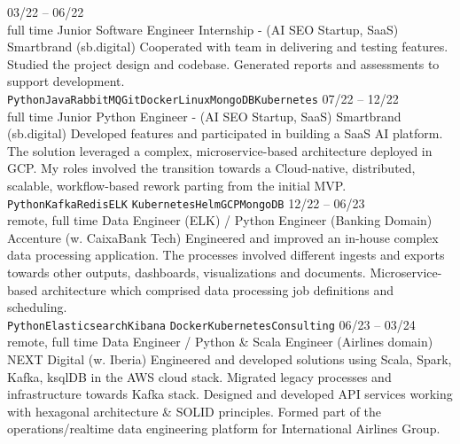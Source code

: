 \documentclass[10pt]{developercv} %
\begin{document}
\begin{entrylist}
	\entry
		{03/22 -- 06/22\\\footnotesize{full time}}
		{Junior Software Engineer Internship - (AI SEO Startup, SaaS)}
		{Smartbrand (sb.digital)}
		{Cooperated with team in delivering and testing features. Studied the project design and codebase. Generated reports and assessments to support development. \\ 
		\texttt{Python}\slashsep\texttt{Java}\slashsep\texttt{RabbitMQ}\slashsep\texttt{Git}\slashsep\texttt{Docker}\slashsep\texttt{Linux}\slashsep\texttt{MongoDB}\slashsep\texttt{Kubernetes}}
	\entry
		{07/22 -- 12/22\\\footnotesize{full time}}
		{Junior Python Engineer - (AI SEO Startup, SaaS)}
		{Smartbrand (sb.digital)}
		{Developed features and participated in building a SaaS AI platform. The solution leveraged a complex, microservice-based architecture deployed in GCP. My roles involved the transition towards a Cloud-native, distributed, scalable, workflow-based rework parting from the initial MVP.\\
		\texttt{Python}\slashsep\texttt{Kafka}\slashsep\texttt{Redis}\slashsep\texttt{ELK}
		\slashsep\texttt{Kubernetes}\slashsep\texttt{Helm}\slashsep\texttt{GCP}\slashsep\texttt{MongoDB}}
	\entry
		{12/22 -- 06/23\\\footnotesize{remote, full time}}
		{Data Engineer (ELK) / Python Engineer (Banking Domain)}
		{Accenture (w. CaixaBank Tech)}
		{
			Engineered and improved an in-house complex data processing application.
			The processes involved different ingests and exports towards other outputs,
			dashboards, visualizations and documents.
			Microservice-based architecture which comprised data processing job
			definitions and scheduling.\\
		\texttt{Python}\slashsep\texttt{Elasticsearch}\slashsep\texttt{Kibana}
		\slashsep\texttt{Docker}\slashsep\texttt{Kubernetes}\slashsep\texttt{Consulting}}
	\entry
		{06/23 -- 03/24\\\footnotesize{remote, full time}}
		{Data Engineer / Python \& Scala Engineer (Airlines domain)}
		{NEXT Digital (w. Iberia)}
		{
			Engineered and developed solutions using Scala, Spark, Kafka, ksqlDB in the AWS cloud stack.
			Migrated legacy processes and infrastructure towards Kafka stack. Designed and developed API services
			working with hexagonal architecture \& SOLID principles. Formed part of the operations/realtime data
			engineering platform for International Airlines Group. 
			\\
}
\end{entrylist}
\end{document}
